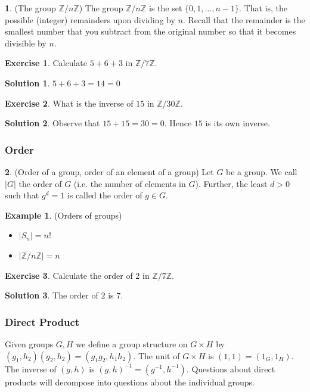 \documentclass[12pt]{article}
\theoremstyle{definition}
\newtheorem{definition}{\color{NavyBlue}{\textbf{Definition}}}
\newtheorem{example}{\color{WildStrawberry}Example}
\newtheorem{exercise}{\color{YellowOrange}Exercise}
\theoremstyle{definition}
\newtheorem{solution}{\color{Goldenrod}Solution}
\begin{document}
\begin{definition}(The group $\mathbb{Z} / n \mathbb{Z}$)
The group $\mathbb{Z} / n \mathbb{Z}$ is the set $\{0,1,\ldots,n-1\}$. That is, the possible (integer) remainders upon dividing by $n$. Recall that the remainder is the smallest number that you subtract from the original number so that it becomes divisible by $n$. 
\end{definition}
\begin{exercise}
Calculate $5 + 6 + 3$ in $\mathbb{Z} / 7 \mathbb{Z}$.
\end{exercise}
\begin{solution}
$5 + 6+ 3 = 14 = 0$
\end{solution}
\begin{exercise}
What is the inverse of $15$ in $\mathbb{Z} / 30 \mathbb{Z}$.
\end{exercise}
\begin{solution}
Observe that $15 + 15 = 30 = 0$. Hence $15$ is its own inverse.
\end{solution}

\subsubsection{Order}

\begin{definition}(Order of a group, order of an element of a group)
Let $G$ be a group. We call $|G|$ the order of $G$ (i.e. the number of elements in $G$). Further, the least $d >0$ such that $g^d = 1$ is called the order of $g \in G$.
\end{definition}
\begin{example}(Orders of groups)
\begin{itemize}
\item $|S_n| = n!$
\item $|\mathbb{Z} / n \mathbb{Z}| = n$
\end{itemize}
\end{example}

\begin{exercise}
Calculate the order of $2$ in $\mathbb{Z} / 7 \mathbb{Z}$.
\end{exercise}
\begin{solution}
The order of $2$ is $7$.
\end{solution}

\subsubsection{Direct Product}
Given groups $G, H$ we define a group structure on $G \times H$ by $(g_1,h_2)(g_2,h_2) = (g_1g_2,h_1h_2)$. The unit of $G \times H$ is $(1,1) = (1_G, 1_H)$. The inverse of $(g,h)$ is $(g,h)^{-1} = (g^{-1}, h^{-1})$. Questions about direct products will decompose into questions about the individual groups. 
\end{document}
